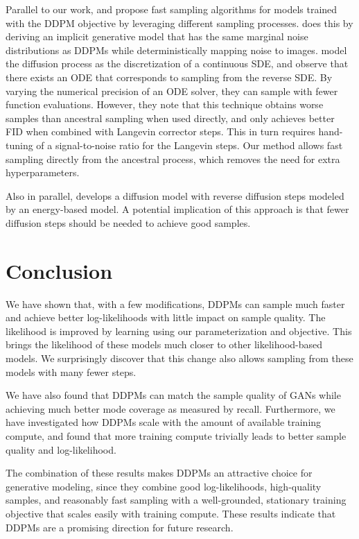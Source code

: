 \documentclass{article}
\begin{document}
Parallel to our work, \citet{ddim} and \citet{sde} propose fast sampling algorithms for models trained with the DDPM objective by leveraging different sampling processes. \citet{ddim} does this by deriving an implicit generative model that has the same marginal noise distributions as DDPMs while deterministically mapping noise to images. \citet{sde} model the diffusion process as the discretization of a continuous SDE, and observe that there exists an ODE that corresponds to sampling from the reverse SDE. By varying the numerical precision of an ODE solver, they can sample with fewer function evaluations. However, they note that this technique obtains worse samples than ancestral sampling when used directly, and only achieves better FID when combined with Langevin corrector steps. This in turn requires hand-tuning of a signal-to-noise ratio for the Langevin steps. Our method allows fast sampling directly from the ancestral process, which removes the need for extra hyperparameters.

Also in parallel, \citet{ebmdiffusion} develops a diffusion model with reverse diffusion steps modeled by an energy-based model. A potential implication of this approach is that fewer diffusion steps should be needed to achieve good samples.

\section{Conclusion}
We have shown that, with a few modifications, DDPMs can sample much faster and achieve better log-likelihoods with little impact on sample quality. The likelihood is improved by learning  using our parameterization and  objective. This brings the likelihood of these models much closer to other likelihood-based models. We surprisingly discover that this change also allows sampling from these models with many fewer steps. 

We have also found that DDPMs can match the sample quality of GANs while achieving much better mode coverage as measured by recall. Furthermore, we have investigated how DDPMs scale with the amount of available training compute, and found that more training compute trivially leads to better sample quality and log-likelihood.

The combination of these results makes DDPMs an attractive choice for generative modeling, since they combine good log-likelihoods, high-quality samples, and reasonably fast sampling with a well-grounded, stationary training objective that scales easily with training compute. These results indicate that DDPMs are a promising direction for future research.
\end{document}
